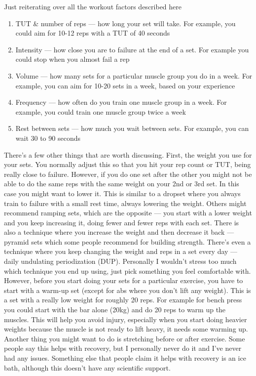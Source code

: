 \documentclass[openany, 12pt]{book}
\begin{document}
        Just reiterating over all the workout factors described here
        \begin{enumerate}
		\item TUT \& number of reps --- how long your set will take. For example, you could aim for 10-12 reps with a TUT of 40 seconds
		\item Intensity --- how close you are to failure at the end of a set. For example you could stop when you almost fail a rep
		\item Volume --- how many sets for a particular muscle group you do in a week. For example, you can aim for 10-20 sets in a week, based on your experience
		\item Frequency --- how often do you train one muscle group in a week. For example, you could train one muscle group twice a week
		\item Rest between sets --- how much you wait between sets. For example, you can wait 30 to 90 seconds
        \end{enumerate}

        There's a few other things that are worth discussing. First, the weight you use for your sets. You normally adjust this so that you hit your rep count or TUT, being really close to failure.
        However, if you do one set after the other you might not be able to do the same reps with the same weight on your 2nd or 3rd set. In this case you might want to lower it. This is similar to
        a dropset where you always train to failure with a small rest time, always lowering the weight. Others might recommend ramping sets, which are the opposite --- you start with a lower weight
        and you keep increasing it, doing fewer and fewer reps with each set. There is also a technique where you increase the weight and then decrease it back --- pyramid sets
        which some people recommend for building strength. There's even a technique where you keep changing the weight and reps in a set every day --- daily undulating periodization (DUP).
        Personally I wouldn't stress too much which technique you end up using, just pick something you feel comfortable with. However, before you start doing your sets for a particular exercise,
        you have to start with a warm-up set (except for abs where you don't lift any weight).
        This is a set with a really low weight for roughly 20 reps. For example for bench press you could start with the bar alone (20kg) and do 20 reps to warm up the muscles. This will help you avoid
        injury, especially when you start doing heavier weights because the muscle is not ready to lift heavy, it needs some warming up. Another thing you might want to do is stretching before or
        after exercise. Some people say this helps with recovery, but I personally never do it and I've never had any issues. Something else that people claim it helps with recovery is an ice bath,
        although this doesn't have any scientific support.
\end{document}
